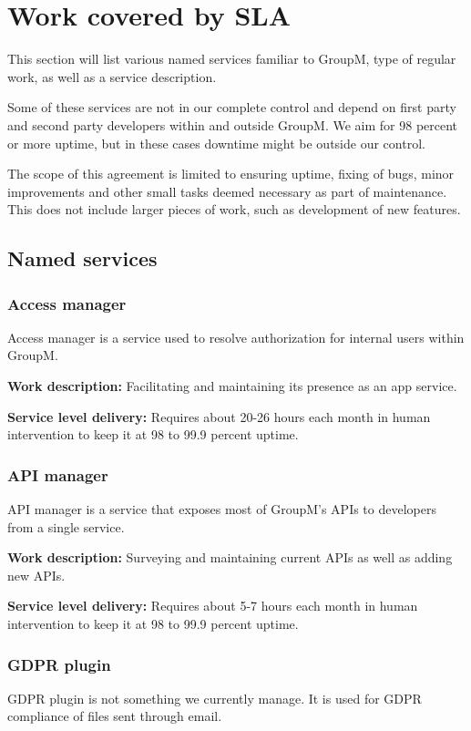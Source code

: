 \section{Work covered by SLA}
This section will list various named services familiar to GroupM, type of regular work, as well as a service description.

Some of these services are not in our complete control and depend on first party and second party developers within and outside GroupM. We aim for 98 percent or more uptime, but in these cases downtime might be outside our control.

The scope of this agreement is limited to ensuring uptime, fixing of bugs, minor improvements and other small tasks deemed necessary as part of maintenance. This does not include larger pieces of work, such as development of new features.

%

\subsection{Named services}


\subsubsection{Access manager}
Access manager is a service used to resolve authorization for internal users within GroupM. 

\textbf{Work description:} Facilitating and maintaining its presence as an app service.

\textbf{Service level delivery:} Requires about 20-26 hours each month in human intervention to keep it at 98 to 99.9 percent uptime.

\subsubsection{API manager}
API manager is a service that exposes most of GroupM's APIs to developers from a single service.

\textbf{Work description:} Surveying and maintaining current APIs as well as adding new APIs.

\textbf{Service level delivery:} Requires about 5-7 hours each month in human intervention to keep it at 98 to 99.9 percent uptime.

\subsubsection{GDPR plugin}
GDPR plugin is not something we currently manage. It is used for GDPR compliance of files sent through email.

